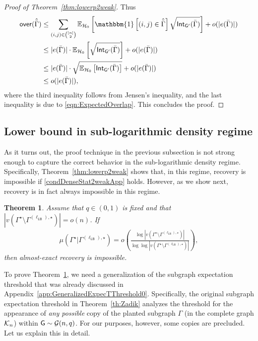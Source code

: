 \documentclass[12pt]{article}
\newcommand{\bE}{\mathbb{E}}
\newtheorem{theorem}{Theorem}
\newcommand{\Ind}{\mathbbm{1}}
\newcommand{\calG}{{\cal G}}
\newcommand{\calH}{{\cal H}}
\newcommand{\calK}{{\cal K}}
\newcommand{\p}[1]{\left(#1\right)}
\newcommand{\pp}[1]{\left[#1\right]}
\newcommand{\s}[1]{\mathsf{#1}}
\begin{document}
\begin{proof}[Proof of Theorem~\ref{thm:lowerp2weak}]
Thus
\begin{align}
\s{over}(\hat{\bar\Gamma})&\leq    \sum_{(i,j)\in\binom{[n]}{2}}\bE_{\calH_0}\pp{\Ind\pp{(i,j)\in\hat{\bar\Gamma}}\sqrt{\s{Int}_{\s{G}'}(\bar\Gamma)}}+o(|e(\bar\Gamma)|)\\
&\leq |e(\bar\Gamma)|\cdot \bE_{\calH_0}\pp{\sqrt{\s{Int}_{\s{G}'}(\bar\Gamma)}}+o(|e(\bar\Gamma)|)\\
&\leq |e(\bar\Gamma)|\cdot\sqrt{\bE_{\calH_0}\pp{\s{Int}_{\s{G}'}(\bar\Gamma)}}+o(|e(\bar\Gamma)|)\\
&\leq o(|e(\bar\Gamma)|),
\end{align}
where the third inequality follows from Jensen's inequality, and the last inequality is due to \eqref{eqn:ExpectedOverlap}. This concludes the proof.

\end{proof}

\subsection{Lower bound in sub-logarithmic density regime}

As it turns out, the proof technique in the previous subsection is not strong enough to capture the correct behavior in the sub-logarithmic density regime. Specifically, Theorem~\ref{thm:lowerp2weak} shows that, in this regime, recovery is impossible if \eqref{condDenseStat2weakApp} holds. However, as we show next, recovery is in fact always impossible in this regime.
\begin{theorem}\label{thm:subLogAlmostExact}
Assume that $q\in(0,1)$ is fixed and that $|v(\Gamma^\star\setminus\Gamma^{(\ell_{\s{LB}}),\star})|=o(n)$. If 
\begin{align}
\mu(\Gamma^\star\vert\Gamma^{(\ell_{\s{LB}}),\star})=o\p{\frac{\log|v(\Gamma^\star\setminus\Gamma^{(\ell_{\s{LB}}),\star})|}{\log \log|v(\Gamma^\star\setminus\Gamma^{(\ell_{\s{LB}}),\star})|}},\label{eq:condCopyLB}
\end{align}
then almost-exact recovery is impossible. 
\end{theorem}
To prove Theorem~\ref{thm:subLogAlmostExact}, we need a generalization of the subgraph expectation threshold that was already discussed in Appendix~\ref{app:GeneralizedExpecTThreshold0}. Specifically, the original subgraph expectation threshold in Theorem~\ref{th:Zadik} analyzes the threshold for the appearance of \emph{any possible} copy of the planted subgraph $\Gamma$ (in the complete graph $\calK_n$) within $\s{G}\sim\calG(n,q)$. For our purposes, however, some copies are precluded. Let us explain this in detail. 
\end{document}
